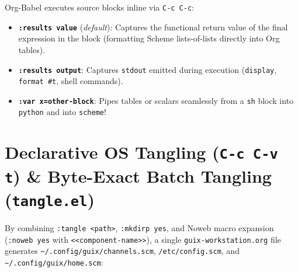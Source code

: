 \documentclass[11pt,oneside]{book}
\begin{document}
Org-Babel executes source blocks inline via \texttt{C-c C-c}:
\begin{itemize}[leftmargin=1.5em]
  \item \textbf{\texttt{:results value}} (\emph{default}): Captures the functional return value of the final expression in the block (formatting Scheme lists-of-lists directly into Org tables).
  \item \textbf{\texttt{:results output}}: Captures \texttt{stdout} emitted during execution (\texttt{display}, \texttt{format \#t}, shell commands).
  \item \textbf{\texttt{:var x=other-block}}: Pipes tables or scalars seamlessly from a \texttt{sh} block into \texttt{python} and into \texttt{scheme}!
\end{itemize}

\section{Declarative OS Tangling (\texttt{C-c C-v t}) \& Byte-Exact Batch Tangling (\texttt{tangle.el})}

By combining \texttt{:tangle <path>}, \texttt{:mkdirp yes}, and Noweb macro expansion (\texttt{:noweb yes} with \texttt{<<component-name>>}), a single \texttt{guix-workstation.org} file generates \texttt{\textasciitilde/.config/guix/channels.scm}, \texttt{/etc/config.scm}, and \texttt{\textasciitilde/.config/guix/home.scm}:
\end{document}
